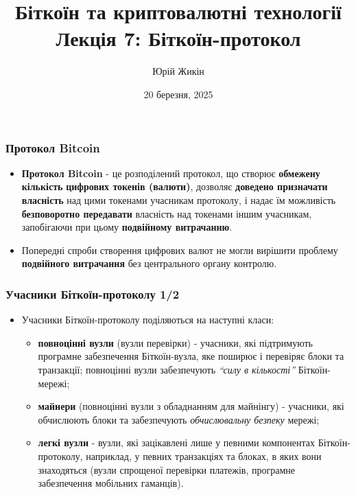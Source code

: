 \documentclass{beamer}
\title{
  Біткоїн та криптовалютні технології \\
  Лекція 7: Біткоїн-протокол
}
\author{Юрій Жикін}
\date{20 березня, 2025}
\begin{document}
\frame{\titlepage}

\begin{frame}
  \frametitle{Протокол Bitcoin}
  \begin{itemize}
  \item \textbf{Протокол Bitcoin} - це розподілений протокол, що створює
    \textbf{обмежену кількість} \textbf{цифрових токенів (валюти)}, дозволяє
    \textbf{доведено призначати власність} над цими токенами учасникам
    протоколу, і надає їм можливість \textbf{безповоротно передавати} власність
    над токенами іншим учасникам, запобігаючи при цьому \textbf{подвійному
      витрачанню}.
  \item Попередні спроби створення цифрових валют не могли вирішити проблему
    \textbf{подвійного витрачання} без центрального органу контролю.
  \end{itemize}
\end{frame}

\begin{frame}
  \frametitle{Учасники Біткоїн-протоколу 1/2}
  \begin{itemize}
  \item Учасники Біткоїн-протоколу поділяються на наступні класи:
    \begin{itemize}
    \item \textbf{повноцінні вузли} (вузли перевірки) - учасники, які
      підтримують програмне забезпечення Біткоїн-вузла, яке поширює і перевіряє
      блоки та транзакції; повноцінні вузли забезпечують \textit{``силу в
        кількості''} Біткоїн-мережі;
    \item \textbf{майнери} (повноцінні вузли з обладнанням для майнінгу) -
      учасники, які обчислюють блоки та забезпечують \textit{обчислювальну
        безпеку} мережі;
    \item \textbf{легкі вузли} - вузли, які зацікавлені лише у певними
      компонентах Біткоїн-протоколу, наприклад, у певних транзакціях та блоках,
      в яких вони знаходяться (вузли спрощеної перевірки платежів, програмне
      забезпечення мобільних гаманців).
    \end{itemize}
  \end{itemize}
\end{frame}
\end{document}
